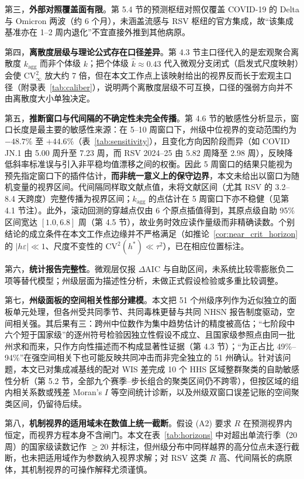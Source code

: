 \documentclass[10pt,a4paper]{article}
\theoremstyle{plain}
\theoremstyle{definition}
\begin{document}
第三，\textbf{外部对照覆盖面有限}。第 5.4 节的预测枢纽对照仅覆盖 COVID-19 的 Delta 与 Omicron 两波（约 6 个月），未涵盖流感与 RSV 枢纽的官方集成，故“该集成基准亦在 1--2 周内退化”不宜直接外推到其他病原。

第四，\textbf{离散度层级与理论公式存在口径差异}。第 4.3 节主口径代入的是宏观聚合离散度 $k_{\text{agg}}$ 而非个体级 $k$；把个体级 $\hat{k} \approx 0.43$ 代入微观分支闭式（启发式尺度映射）会使 $\text{CV}^2_\infty$ 放大约 7 倍，但在本文工作点上该映射给出的视界反而长于宏观主口径（附录表~\ref{tab:caliber}），说明两个离散度层级不可互换，口径的强弱方向并不由离散度大小单独决定。

第五，\textbf{推断窗口与代间隔的不确定性未完全传播}。第 4.6 节的敏感性分析显示，窗口长度是最主要的敏感性来源：在 5--10 周窗口下，州级中位视界的变动范围约为 $-48.7\%$ 至 $+44.6\%$（表~\ref{tab:sensitivity}），且变化方向因阶段而异（如 COVID JN.1 由 5.00 周升至 7.23 周，而 RSV 2024--25 由 5.82 周降至 2.98 周），反映降低斜率标准误与引入非平稳均值漂移之间的权衡。因此 5 周窗口的结果只能视为预先指定窗口下的插件估计，\textbf{而非统一意义上的保守边界}，本文未给出以窗口为随机变量的视界区间。代间隔同样取文献点值，未将文献区间（尤其 RSV 的 3.2--8.4 天跨度）完整传播为视界区间；$k_{\text{agg}}$ 的点估计在 5 周窗口下亦不稳健（见第 4.1 节注）。此外，滚动回测的穿越点仅由 6 个原点插值得到，其原点级自助 95\% 区间宽达 $[1.0, 6.8]$ 周（第 4.5 节），故业务时效应读作量级而非精确读数。个别结论的成立条件在本文工作点边缘并不严格满足（如推论~\ref{cor:near_crit_horizon} 的 $|h\varepsilon| \ll 1$、尺度不变性的 $\text{CV}^2(h^*) \ll \tau^2$），已在相应位置标注。

第六，\textbf{统计报告完整性}。微观层仅报 $\Delta\text{AIC}$ 与自助区间，未系统比较零膨胀负二项等替代模型；州级层面为描述性分析，未做正式假设检验或多重比较调整。

第七，\textbf{州级面板的空间相关性部分建模}。本文把 51 个州级序列作为近似独立的面板单元处理，但各州受共同季节、共同毒株更替与共同 NHSN 报告制度驱动，空间相关强。其后果有三：跨州中位数作为集中趋势估计的精度被高估；“七阶段中六个短于国家级”的逐州符号检验因独立性假设不成立、且国家级参照点由同一批州求和而来，只作方向性描述而不构成显著性证据（第 4.3 节）；“为正占比 49\%--94\%”在强空间相关下也可能反映共同冲击而非完全独立的 51 州确认。针对该问题，本文已对集成减基线的配对 WIS 差完成 10 个 HHS 区域整群聚类的自助敏感性分析（第 5.2 节，全部九个赛季--步长组合的聚类区间仍不跨零），但按区域的组内相关系数或残差 Moran's $I$ 等空间统计诊断，以及州级双窗口误差记账的空间聚类区间，仍留待后续。

第八，\textbf{机制视界的适用域未在数值上统一截断}。假设 (A2) 要求 $R$ 在预测视界内恒定，而视界方程本身不含闸门。本文在表~\ref{tab:horizons} 中对超出单流行季（20 周）的国家级读数记作 $\ge 20$ 并标注，但州级分布中同样越界的高分位点未逐行截断，也未把适用域作为参数纳入视界求解；对 RSV 这类 $R$ 高、代间隔长的病原体，其机制视界的可操作解释尤须谨慎。
\end{document}
